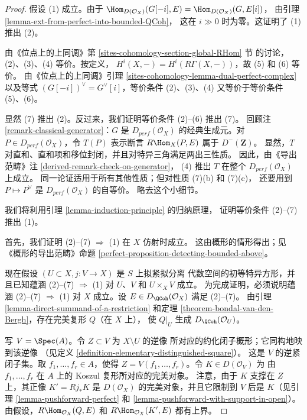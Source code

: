 \begin{proof}
假设 (1) 成立。由于
$\Hom_{D(\mathcal{O}_X)}(G[-i], E) = \Hom_{D(\mathcal{O}_X)}(G, E[i])$，
由引理 \ref{lemma-ext-from-perfect-into-bounded-QCoh}，
这在 $i \gg 0$ 时为零。这证明了 (1) 推出 (2)。

\medskip\noindent
由《位点上的上同调》第 \ref{sites-cohomology-section-global-RHom} 节
的讨论，(2)、(3)、(4) 等价。按定义，
$H^i(X, -) = H^i(R\Gamma(X, -))$，故 (5) 和 (6) 等价。
由《位点上的上同调》引理
\ref{sites-cohomology-lemma-dual-perfect-complex} 以及等式
$(G[-i])^\vee = G^\vee[i]$，等价条件 (2)、(3)、(4)
又等价于等价条件 (5)、(6)。

\medskip\noindent
显然 (7) 推出 (2)。反过来，我们证明等价条件 (2)--(6) 推出 (7)。
回顾注 \ref{remark-classical-generator}：$G$ 是
$D_{perf}(\mathcal{O}_X)$ 的经典生成元。对
$P \in D_{perf}(\mathcal{O}_X)$，令 $T(P)$ 表示断言
$R\Hom_X(P, E)$ 属于 $D^-(\mathbf{Z})$。
显然，$T$ 对直和、直和项和移位封闭，并且对特异三角满足两出三性质。
因此，由《导出范畴》注 \ref{derived-remark-check-on-generator}，
(4) 推出 $T$ 在整个 $D_{perf}(\mathcal{O}_X)$ 上成立。
同一论证适用于所有其他性质；但对性质 (7)(b) 和 (7)(c)，%
还要用到 $P \mapsto P^\vee$ 是 $D_{perf}(\mathcal{O}_X)$ 的自等价。
略去这个小细节。

\medskip\noindent
我们将利用引理 \ref{lemma-induction-principle} 的归纳原理，
证明等价条件 (2)--(7) 推出 (1)。

\medskip\noindent
首先，我们证明 (2)--(7) $\Rightarrow$ (1) 在 $X$ 仿射时成立。
这由概形的情形得出；见《概形的导出范畴》命题
\ref{perfect-proposition-detecting-bounded-above}。

\medskip\noindent
现在假设 $(U \subset X, j : V \to X)$ 是 $S$ 上拟紧拟分离
代数空间的初等特异方形，并且已知蕴涵 (2)--(7) $\Rightarrow$ (1)
对 $U$、$V$ 和 $U \times_X V$ 成立。
为完成证明，必须说明蕴涵 (2)--(7) $\Rightarrow$ (1) 对 $X$ 成立。设
$E \in D_\QCoh(\mathcal{O}_X)$ 满足 (2)--(7)。
由引理 \ref{lemma-direct-summand-of-a-restriction} 和定理
\ref{theorem-bondal-van-den-Bergh}，存在完美复形 $Q$（在 $X$ 上），
使 $Q|_U$ 生成 $D_\QCoh (\mathcal{O}_U)$。

\medskip\noindent
写 $V = \Spec(A)$。令 $Z \subset V$ 为 $X \setminus U$ 的逆像
所对应的约化闭子概形；它同构地映到该逆像
（见定义 \ref{definition-elementary-distinguished-square}）。
这是 $V$ 的逆紧闭子集。取 $f_1, \ldots, f_r \in A$，使得
$Z = V(f_1, \ldots, f_r)$。令 $K \in D(\mathcal{O}_V)$ 为
由 $f_1, \ldots, f_r$ 在 $A$ 上的 Koszul 复形所对应的完美对象。
注意，由于 $K$ 支撑在 $Z$ 上，其正像
$K' = Rj_*K$ 是 $D(\mathcal{O}_X)$ 的完美对象，并且它限制到
$V$ 后是 $K$（见引理 \ref{lemma-pushforward-perfect} 和
\ref{lemma-pushforward-with-support-in-open}）。
由假设，$R\Hom_{\mathcal{O}_X}(Q, E)$ 和
$R\Hom_{\mathcal{O}_X}(K', E)$ 都有上界。


\end{proof}
